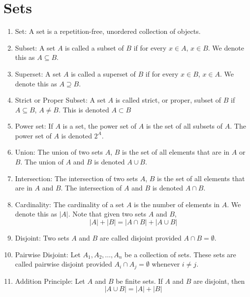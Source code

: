 \documentclass{article}
\begin{document}
	\section*{Sets}
	
	\begin{enumerate}
		
		\item Set: A set is a repetition-free, unordered collection of objects.
		
		\item Subset: A set $A$ is called a subset of $B$ if for every $x\in A$, $x\in B$.
		We denote this as $A\subseteq B$.
		
		\item Superset: A set $A$ is called a superset of $B$ if for every $x\in B$, $x\in A$.
		We denote this as $A\supseteq B$.
		
		\item Strict or Proper Subset: A set $A$ is called strict, or proper, subset of $B$ if $A \subseteq B$, $A\neq B$.
		This is denoted $A\subset B$
		
		\item Power set: If $A$ is a set, the power set of $A$ is the set of all subsets of $A$.
		The power set of $A$ is denoted $2^A$.
		
		\item Union: The union of two sets $A$, $B$ is the set of all elements that are in $A$ or $B$.
		The union of $A$ and $B$ is denoted $A\cup B$.
		
		\item Intersection: The intersection of two sets $A$, $B$ is the set of all elements that are in $A$ and $B$.
		The intersection of $A$ and $B$ is denoted $A\cap B$.
		
		\item Cardinality: The cardinality of a set $A$ is the number of elements in $A$.
		We denote this as $|A|$. Note that given two sets $A$ and $B$,
		\[|A|+|B|=|A\cap B|+|A\cup B|\]
		
		\item Disjoint: Two sets $A$ and $B$ are called disjoint provided $A\cap B=\emptyset$.
		
		\item Pairwise Disjoint: Let $A_1,A_2,\dots,A_n$ be a collection of sets.
		These sets are called pairwise disjoint provided $A_i\cap A_j=\emptyset$ whenever $i\neq j$.
		
		\item Addition Principle: Let $A$ and $B$ be finite sets.
		If $A$ and $B$ are disjoint, then
		\[|A\cup B|=|A|+|B|\]
		

\end{enumerate}
\end{document}
